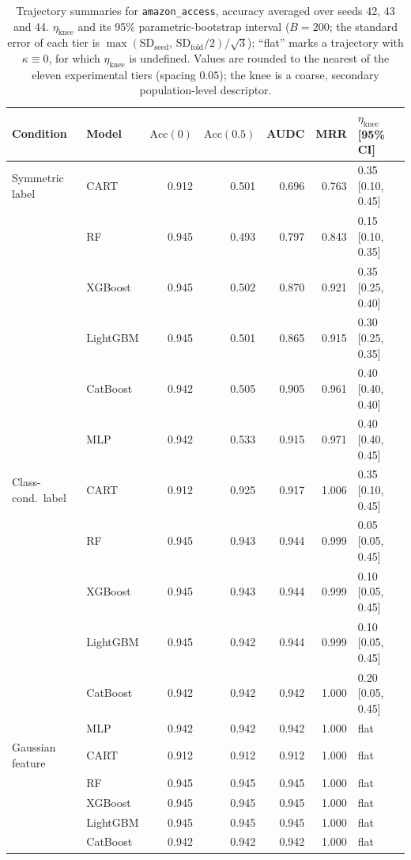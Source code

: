\begin{table}[p]
\centering
\scriptsize
\setlength{\tabcolsep}{3.5pt}
\caption{Trajectory summaries for \texttt{amazon\_access}, accuracy averaged over seeds 42, 43 and 44. $\eta_{\mathrm{knee}}$ and its 95\% parametric-bootstrap interval ($B=200$; the standard error of each tier is $\max(\mathrm{SD}_{\mathrm{seed}},\,\mathrm{SD}_{\mathrm{fold}}/2)/\sqrt3$); ``flat'' marks a trajectory with $\kappa\equiv 0$, for which $\eta_{\mathrm{knee}}$ is undefined. Values are rounded to the nearest of the eleven experimental tiers (spacing $0.05$); the knee is a coarse, secondary population-level descriptor.}
\label{tab:traj_amazon_access}
\begin{tabular}{@{}llrrrrl@{}}
\toprule
Condition & Model & $\mathrm{Acc}(0)$ & $\mathrm{Acc}(0.5)$ & AUDC & MRR & $\eta_{\mathrm{knee}}$ [95\% CI] \\
\midrule
Symmetric label & CART & 0.912 & 0.501 & 0.696 & 0.763 & 0.35 [0.10, 0.45] \\
 & RF & 0.945 & 0.493 & 0.797 & 0.843 & 0.15 [0.10, 0.35] \\
 & XGBoost & 0.945 & 0.502 & 0.870 & 0.921 & 0.35 [0.25, 0.40] \\
 & LightGBM & 0.945 & 0.501 & 0.865 & 0.915 & 0.30 [0.25, 0.35] \\
 & CatBoost & 0.942 & 0.505 & 0.905 & 0.961 & 0.40 [0.40, 0.40] \\
 & MLP & 0.942 & 0.533 & 0.915 & 0.971 & 0.40 [0.40, 0.45] \\
\midrule
Class-cond.\ label & CART & 0.912 & 0.925 & 0.917 & 1.006 & 0.35 [0.10, 0.45] \\
 & RF & 0.945 & 0.943 & 0.944 & 0.999 & 0.05 [0.05, 0.45] \\
 & XGBoost & 0.945 & 0.943 & 0.944 & 0.999 & 0.10 [0.05, 0.45] \\
 & LightGBM & 0.945 & 0.942 & 0.944 & 0.999 & 0.10 [0.05, 0.45] \\
 & CatBoost & 0.942 & 0.942 & 0.942 & 1.000 & 0.20 [0.05, 0.45] \\
 & MLP & 0.942 & 0.942 & 0.942 & 1.000 & flat \\
\midrule
Gaussian feature & CART & 0.912 & 0.912 & 0.912 & 1.000 & flat \\
 & RF & 0.945 & 0.945 & 0.945 & 1.000 & flat \\
 & XGBoost & 0.945 & 0.945 & 0.945 & 1.000 & flat \\
 & LightGBM & 0.945 & 0.945 & 0.945 & 1.000 & flat \\
 & CatBoost & 0.942 & 0.942 & 0.942 & 1.000 & flat \\

\end{tabular}
\end{table}
